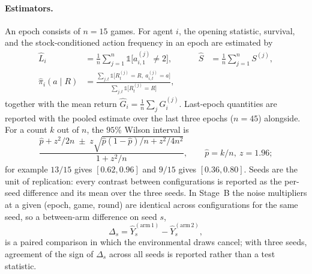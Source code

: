 \paragraph{Estimators.}
An epoch consists of \(n = 15\) games.
For agent \(i\), the opening statistic, survival, and the stock-conditioned
action frequency in an epoch are estimated by
\begin{equation}
  \begin{aligned}
  \hat{L}_i &= \frac{1}{n} \sum_{j=1}^{n} \mathbb{1}\bigl[a^{(j)}_{i,1} \ne 2\bigr],
  &\qquad
  \hat{S} &= \frac{1}{n} \sum_{j=1}^{n} S^{(j)}, \\[2pt]
  \hat{\pi}_i(a \mid R) &= \frac{\sum_{j,t} \mathbb{1}\bigl[R^{(j)}_t = R,\ a^{(j)}_{i,t} = a\bigr]}
  {\sum_{j,t} \mathbb{1}\bigl[R^{(j)}_t = R\bigr]},
  \end{aligned}
  \label{eq:estimators}
\end{equation}
together with the mean return \(\hat{G}_i = \frac{1}{n}\sum_j G_i^{(j)}\).
Last-epoch quantities are reported with the pooled estimate over the last
three epochs (\(n = 45\)) alongside.
For a count \(k\) out of \(n\), the \(95\%\) Wilson interval is
\begin{equation}
  \frac{\hat{p} + z^2/2n \;\pm\; z\sqrt{\hat{p}(1-\hat{p})/n + z^2/4n^2}}{1 + z^2/n},
  \qquad \hat{p} = k/n,\ z = 1.96 ;
  \label{eq:wilson}
\end{equation}
for example \(13/15\) gives \([0.62, 0.96]\) and \(9/15\) gives
\([0.36, 0.80]\).
Seeds are the unit of replication: every contrast between configurations
is reported as the per-seed difference and its mean over the three seeds.
In Stage~B the noise multipliers at a given (epoch, game, round) are
identical across configurations for the same seed, so a between-arm
difference on seed \(s\),
\begin{equation}
  \Delta_s = \hat{Y}^{(\mathrm{arm}\,1)}_s - \hat{Y}^{(\mathrm{arm}\,2)}_s ,
  \label{eq:paired}
\end{equation}
is a paired comparison in which the environmental draws cancel; with three
seeds, agreement of the sign of \(\Delta_s\) across all seeds is reported
rather than a test statistic.

